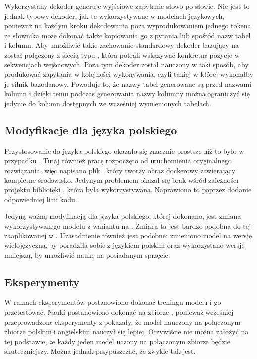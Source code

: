 Wykorzystany dekoder generuje wyjściowe zapytanie słowo po słowie. Nie jest to jednak typowy dekoder, jak te wykorzystywane w modelach językowych, ponieważ na każdym kroku dekodowania poza wyprodukowaniem jednego tokena ze słownika może dokonać także kopiowania go z pytania lub spośród nazw tabel i kolumn. Aby umożliwić takie zachowanie standardowy dekoder bazujący na  został połączony z siecią typu  , która potrafi wskazywać konkretne pozycje w sekwencjach wejściowych. Poza tym dekoder został nauczony w taki sposób, aby produkować zapytania w kolejności wykonywania, czyli takiej w której wykonałby je silnik bazodanowy. Powoduje to, że nazwy tabel generowane są przed nazwami kolumn i dzięki temu podczas generowania nazwy kolumny można ograniczyć się jedynie do kolumn dostępnych we wcześniej wymienionych tabelach.

\subsection{Modyfikacje dla języka polskiego}
Przystosowanie  do języka polskiego okazało się znacznie prostsze niż to było w przypadku . Tutaj również pracę rozpoczęto od uruchomienia oryginalnego rozwiązania, więc napisano plik , który tworzy obraz dockerowy zawierający kompletne środowisko. Jedynym problemem okazał się brak wśród zależności projektu biblioteki , która była wykorzystywana. Naprawiono to poprzez dodanie odpowiedniej linii kodu.

Jedyną ważną modyfikacją dla języka polskiego, której dokonano, jest zmiana wykorzystywanego modelu  z wariantu  na . Zmiana ta jest bardzo podobna do tej zaaplikowanej w . Uzasadnienie również jest podobne: zmieniono model na wersję wielojęzyczną, by poradziła sobie z językiem polskim oraz wykorzystano wersję mniejszą, by umożliwić naukę na posiadanym sprzęcie. 

\subsection{Eksperymenty}
W ramach eksperymentów postanowiono dokonać treningu modelu  i go przetestować. Nauki postanowiono dokonać na zbiorze , ponieważ wcześniej przeprowadzone eksperymenty z  pokazały, że model nauczony na połączonym zbiorze polskim i angielskim nauczył się lepiej. Oczywiście nie można założyć na tej podstawie, że każdy jeden model uczony na połączonym zbiorze będzie skuteczniejszy. Można jednak przypuszczać, że zwykle tak jest.

